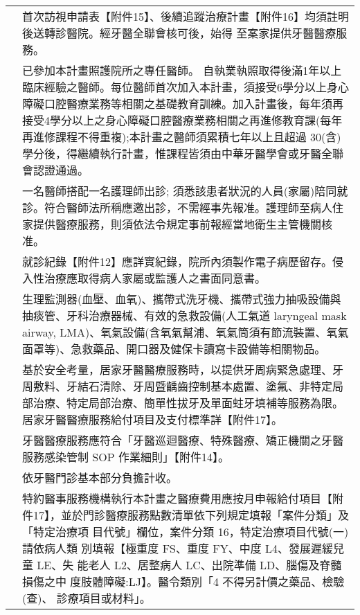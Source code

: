 \begin{longtable}{p{1.3in}p{4.8in}}

\color{OliveGreen}{事前申請}
 & 首次訪視申請表【附件15】、後續追蹤治療計畫【附件16】均須註明後送轉診醫院。經牙醫全聯會核可後，始得 至案家提供牙醫醫療服務。 \\
 
\color{OliveGreen}{醫師資格}
& 已參加本計畫照護院所之專任醫師。
自執業執照取得後滿1年以上臨床經驗之醫師。每位醫師首次加入本計畫，須接受6學分以上身心障礙口腔醫療業務等相關之基礎教育訓練。加入計畫後，每年須再接受4學分以上之身心障礙口腔醫療業務相關之再進修教育課(每年再進修課程不得重複);本計畫之醫師須累積七年以上且超過 30(含)學分後，得繼續執行計畫，惟課程皆須由中華牙醫學會或牙醫全聯會認證通過。 \\

\color{OliveGreen}{居家小組}
 & 一名醫師搭配一名護理師出診; 須悉該患者狀況的人員(家屬)陪同就診。符合醫師法所稱應邀出診，不需經事先報准。護理師至病人住家提供醫療服務，則須依法令規定事前報經當地衛生主管機關核准。\\
 
\color{OliveGreen}{就診文書}
& 就診紀錄【附件12】應詳實紀錄，院所內須製作電子病歷留存。侵入性治療應取得病人家屬或監護人之書面同意書。\\
 
\color{OliveGreen}{攜帶設備}
& 生理監測器(血壓、血氧)、攜帶式洗牙機、攜帶式強力抽吸設備與抽痰管、牙科治療器械、有效的急救設備(人工氣道 laryngeal mask airway, LMA)、氧氣設備(含氧氣幫浦、氧氣筒須有節流裝置、氧氣面罩等)、急救藥品、開口器及健保卡讀寫卡設備等相關物品。\\

\color{OliveGreen}{照護內容}
& 基於安全考量，居家牙醫醫療服務時，以提供牙周病緊急處理、牙周敷料、牙結石清除、牙周暨齲齒控制基本處置、塗氟、非特定局部治療、特定局部治療、簡單性拔牙及單面蛀牙填補等服務為限。居家牙醫醫療服務給付項目及支付標準詳【附件17】。\\

\color{OliveGreen}{感染管制}
& 牙醫醫療服務應符合「牙醫巡迴醫療、特殊醫療、矯正機關之牙醫服務感染管制 SOP 作業細則」【附件14】。\\

\color{OliveGreen}{部分負擔}
& 依牙醫門診基本部分負擔計收。\\

\color{OliveGreen}{醫療費用}
& 特約醫事服務機構執行本計畫之醫療費用應按月申報給付項目【附件17】，並於門診醫療服務點數清單依下列規定填報「案件分類」及「特定治療項 目代號」欄位，案件分類 16，特定治療項目代號(一)請依病人類 別填報【極重度 FS、重度 FY、中度 L4、發展遲緩兒童 LE、失 能老人 L2、居整病人 LC、出院準備 LD、腦傷及脊髓損傷之中 度肢體障礙:LJ】。醫令類別「4 不得另計價之藥品、檢驗(查)、 診療項目或材料」。\\

\end{longtable}

